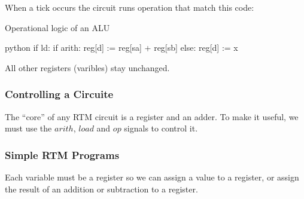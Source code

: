 \noindent
When a tick occurs the circuit runs operation that match this code:
\begin{highlight}{Operational logic of an ALU}
    \begin{code}{python}
		if ld:
		if arith:
		reg[d] := reg[sa] + reg[sb]
		else:
		reg[d] := x
	\end{code}
\end{highlight}
%
All other registers (varibles) stay unchanged.

\subsubsection{Controlling a Circuite}\label{ssub:controlling_a_circuite}

The ``core'' of any RTM circuit is a register and an adder.
To make it useful, we must use the \(arith\), \(load\) and \(op\) signals to control it.

\subsubsection{Simple RTM Programs}\label{ssub:simple_rtm_programs}

Each variable must be a register so we can assign a value to a register, or assign the result of an addition or subtraction to a register.
